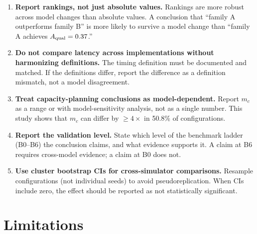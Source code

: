 \documentclass[aps,prapplied,reprint,superscriptaddress]{revtex4-2}
\newcommand{\Aqual}{A_{\rm qual}}
\begin{document}
\begin{enumerate}[leftmargin=2em]
\item \textbf{Report rankings, not just absolute values.} Rankings are more robust across model changes than absolute values. A conclusion that ``family A outperforms family B'' is more likely to survive a model change than ``family A achieves $\Aqual = 0.37$.''

\item \textbf{Do not compare latency across implementations without harmonizing definitions.} The timing definition must be documented and matched. If the definitions differ, report the difference as a definition mismatch, not a model disagreement.

\item \textbf{Treat capacity-planning conclusions as model-dependent.} Report $m_c$ as a range or with model-sensitivity analysis, not as a single number. This study shows that $m_c$ can differ by $\geq 4\times$ in 50.8\% of configurations.

\item \textbf{Report the validation level.} State which level of the benchmark ladder (B0--B6) the conclusion claims, and what evidence supports it. A claim at B6 requires cross-model evidence; a claim at B0 does not.

\item \textbf{Use cluster bootstrap CIs for cross-simulator comparisons.} Resample configurations (not individual seeds) to avoid pseudoreplication. When CIs include zero, the effect should be reported as not statistically significant.
\end{enumerate}

\section{Limitations}
\label{sec:limitations}
\end{document}
